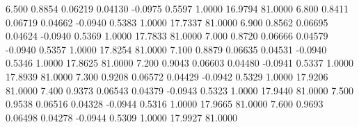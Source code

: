    6.500   0.8854   0.06219   0.04130  -0.0975   0.5597   1.0000  16.9794  81.0000
   6.800   0.8411   0.06719   0.04662  -0.0940   0.5383   1.0000  17.7337  81.0000
   6.900   0.8562   0.06695   0.04624  -0.0940   0.5369   1.0000  17.7833  81.0000
   7.000   0.8720   0.06666   0.04579  -0.0940   0.5357   1.0000  17.8254  81.0000
   7.100   0.8879   0.06635   0.04531  -0.0940   0.5346   1.0000  17.8625  81.0000
   7.200   0.9043   0.06603   0.04480  -0.0941   0.5337   1.0000  17.8939  81.0000
   7.300   0.9208   0.06572   0.04429  -0.0942   0.5329   1.0000  17.9206  81.0000
   7.400   0.9373   0.06543   0.04379  -0.0943   0.5323   1.0000  17.9440  81.0000
   7.500   0.9538   0.06516   0.04328  -0.0944   0.5316   1.0000  17.9665  81.0000
   7.600   0.9693   0.06498   0.04278  -0.0944   0.5309   1.0000  17.9927  81.0000

